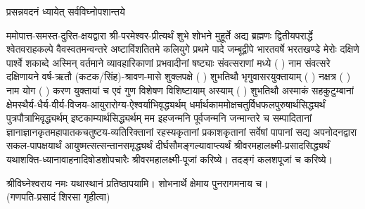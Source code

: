 
\setlength{\parindent}{0pt}


 

{प्रसन्नवदनं ध्यायेत् सर्वविघ्नोपशान्तये}
 

ममोपात्त-समस्त-दुरित-क्षयद्वारा श्री-परमेश्वर-प्रीत्यर्थं शुभे शोभने मुहूर्ते अद्य ब्रह्मणः
द्वितीयपरार्द्धे श्वेतवराहकल्पे वैवस्वतमन्वन्तरे अष्टाविंशतितमे कलियुगे प्रथमे पादे
जम्बूद्वीपे भारतवर्षे भरतखण्डे मेरोः दक्षिणे पार्श्वे शकाब्दे अस्मिन् वर्तमाने व्यावहारिकाणां प्रभवादीनां षष्ट्याः संवत्सराणां मध्ये (  ) नाम संवत्सरे दक्षिणायने 
वर्ष-ऋतौ (कटक/सिंह)-श्रावण-मासे शुक्लपक्षे ( ) शुभतिथौ भृगुवासरयुक्तायाम्
(  ) नक्षत्र (  ) नाम  योग  ( ) करण युक्तायां च एवं गुण विशेषण विशिष्टायाम्
अस्याम् ( ) शुभतिथौ 
अस्माकं सहकुटुम्बानां क्षेमस्थैर्य-धैर्य-वीर्य-विजय-आयुरारोग्य-ऐश्वर्याभिवृद्ध्यर्थम्
 धर्मार्थकाममोक्ष\-चतुर्विधफलपुरुषार्थसिद्ध्यर्थं पुत्रपौत्राभि\-वृद्ध्यर्थम् इष्टकाम्यार्थसिद्ध्यर्थम्
मम इहजन्मनि पूर्वजन्मनि जन्मान्तरे च सम्पादितानां ज्ञानाज्ञानकृतमहा\-पातकचतुष्टय-व्यतिरिक्तानां रहस्यकृतानां प्रकाशकृतानां सर्वेषां पापानां सद्य अपनोदनद्वारा सकल-पापक्षयार्थं आयुष्मत्सत्सन्तानसमृद्ध्यर्थं दीर्घसौमङ्गल्यावाप्त्यर्थं
श्रीवरमहालक्ष्मी-प्रसादसिद्ध्यर्थं 
यथाशक्ति-ध्यानावाहनादिषोडशोपचारैः 
श्रीवरमहालक्ष्मी-पूजां करिष्ये। तदङ्गं कलशपूजां च करिष्ये। 


श्रीविघ्नेश्वराय नमः यथास्थानं प्रतिष्ठापयामि। शोभनार्थे क्षेमाय पुनरागमनाय च।\\
(गणपति-प्रसादं शिरसा गृहीत्वा)













